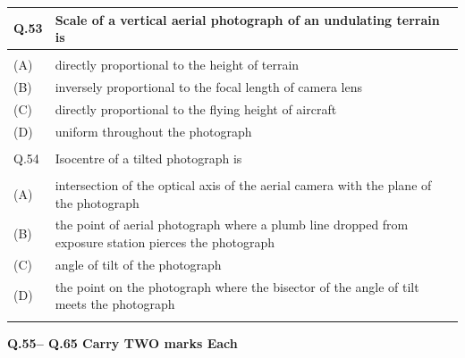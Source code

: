 \documentclass[12pt]{article}
\begin{document}
\begin{table}[H]
\renewcommand{\arraystretch}{3}
\setlength{\tabcolsep}{8pt}
\begin{tabular}{|l|p{15cm}|}
\hline
 
Q.53& Scale of a vertical aerial photograph of an undulating terrain is\\ \hline 
 & \\ \hline
(A)&directly proportional to the height of terrain\\ \hline
(B)&inversely proportional to the focal length of camera lens\\ \hline
(C)&directly proportional to the flying height of aircraft\\ \hline
(D)&uniform throughout the photograph\\ \hline
 & \\ \hline

Q.54 &Isocentre of a tilted photograph is\\ \hline
 & \\ \hline
(A)&intersection of the optical axis of the aerial camera with the plane of the photograph\\ \hline
(B)&the point of aerial photograph where a plumb line dropped from exposure station
pierces the photograph\\ \hline
(C)&angle of tilt of the photograph\\ \hline
(D)&the point on the photograph where the bisector of the angle of tilt meets the
photograph\\ \hline
& \\ \hline

\end{tabular}
\end{table}

\newpage

\textbf{Q.55– Q.65 Carry TWO marks Each}
\end{document}
